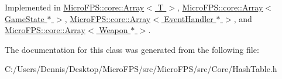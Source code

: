 Implemented in \hyperlink{class_micro_f_p_s_1_1core_1_1_array_a9109e034d60452896a9dfca14aa666d9}{MicroFPS::core::Array$<$ T $>$}, \hyperlink{class_micro_f_p_s_1_1core_1_1_array_a9109e034d60452896a9dfca14aa666d9}{MicroFPS::core::Array$<$ GameState $\ast$ $>$}, \hyperlink{class_micro_f_p_s_1_1core_1_1_array_a9109e034d60452896a9dfca14aa666d9}{MicroFPS::core::Array$<$ EventHandler $\ast$ $>$}, and \hyperlink{class_micro_f_p_s_1_1core_1_1_array_a9109e034d60452896a9dfca14aa666d9}{MicroFPS::core::Array$<$ Weapon $\ast$ $>$}.



The documentation for this class was generated from the following file:\begin{DoxyCompactItemize}
\item 
C:/Users/Dennis/Desktop/MicroFPS/src/MicroFPS/src/Core/HashTable.h\end{DoxyCompactItemize}
